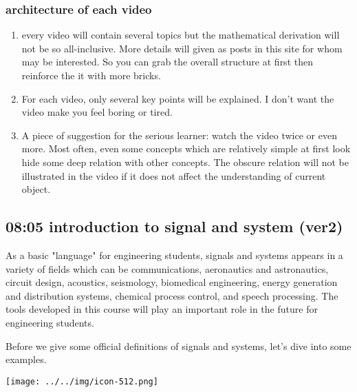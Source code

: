 \documentclass[koma,utopia,letterpaper,captions=tableheading,11pt,listings-sv,microtype,paralist,colorlinks=true,urlcolor=blue]{org-article}
\begin{document}
\subsubsection{architecture of each video}
\label{sec:org29e6fbc}


\begin{enumerate}
\item every video will contain several topics but the mathematical derivation will
not be so all-inclusive. More details will given as posts in this site for whom
may be interested. So you can grab the overall structure at first then
reinforce the it with more bricks.
\item For each video, only several key points will be explained. I don't want the
video make you feel boring or tired.
\item A piece of suggestion for the serious learner: watch the video twice or even
more. Most often, even some concepts which are relatively simple at first
look hide some deep relation with other concepts. The obscure relation will
not be illustrated in the video if it does not affect the understanding of
current object.
\end{enumerate}

\subsection{08:05 introduction to signal and system (ver2)}
\label{sec:org0a474bf}


As a basic "language" for engineering students, signals and systems appears in a
variety of fields which can be communications, aeronautics and astronautics,
circuit design, acoustics, seismology, biomedical engineering, energy generation
and distribution systems, chemical process control, and speech processing. The
tools developed in this course will play an important role in the future for
engineering students.

Before we give some official definitions of signals and systems, let's dive into
some examples.
\begin{center}
\texttt{[image: ../../img/icon-512.png]}
\end{center}
\end{document}
